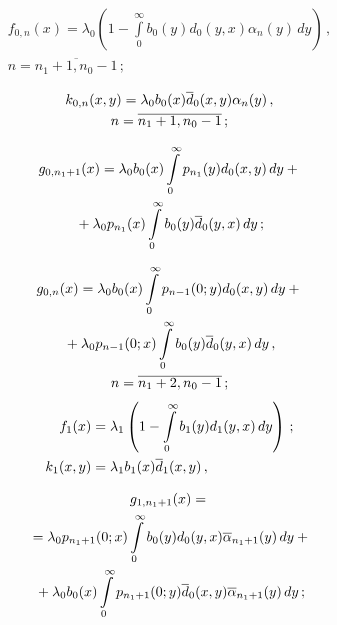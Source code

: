 \begin{multicols}{2}
\vspace*{-24pt}

\noindent
\begin{multline*}
f_{0,n}(x)= \lambda_0 \left(
1 - \int\limits_0^\infty b_0(y) d_0(y,x) \alpha_n(y)\, dy
\right)\,,
\\ n=\overline{n_1+1,n_0-1}\,;
\end{multline*}

\vspace*{-12pt}

\noindent
\begin{multline*}
k_{0,n}(x,y) = \lambda_0 b_0(x) \overline d_0(x,y) \alpha_n(y) \,,
\\ n=\overline{n_1+1,n_0-1}\,;
\end{multline*}

\vspace*{-12pt}

\noindent
\begin{multline*}
g_{0,n_1+1}(x) = \lambda_0 b_0(x) \int\limits_0^\infty p_{n_1}(y) d_0(x,y)\, dy
+{}\\
{}+
\lambda_0 p_{n_1}(x) \int\limits_0^\infty b_0(y) \overline d_0(y,x)\, dy\,;
\end{multline*}

\vspace*{-12pt}

\noindent
\begin{multline*}
g_{0,n}(x) = \lambda_0 b_0(x) \int\limits_0^\infty p_{n-1}(0;y) d_0(x,y)\, dy
+{}\\
{}+ \lambda_0 p_{n-1}(0;x) \int\limits_0^\infty b_0(y) \overline d_0(y,x)\, dy\,,
\\ 
n=\overline{n_1+2,n_0-1}\,;
\end{multline*}
\begin{align}
\label{3-gf-1-m}
f_1(x)&= \lambda_1 \left(
1 - \int\limits_0^\infty b_1(y) d_1(y,x)\, dy\right)\,;
\\
\label{3-gf-2-m}
k_1(x,y) &= \lambda_1 b_1(x) \overline d_1(x,y) \,,
\end{align}

\vspace*{-12pt}

\noindent
\begin{multline*}
g_{1,n_1+1}(x)={}\\
 {}=\lambda_0 p_{n_1+1}(0;x)\int\limits_0^\infty b_0(y) d_0(y,x) 
\overline\alpha_{n_1+1}(y)\, dy
+{}
\\
{}+ \lambda_0 b_0(x) \int\limits_0^\infty p_{n_1+1}(0;y) \overline d_0(x,y) \overline\alpha_{n_1+1}(y)\, dy\,;
\end{multline*}



\end{multicols}
